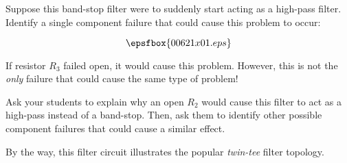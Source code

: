 

Suppose this band-stop filter were to suddenly start acting as a high-pass filter.  Identify a single component failure that could cause this problem to occur:

$$\epsfbox{00621x01.eps}$$







If resistor $R_3$ failed open, it would cause this problem.  However, this is not the {\it only} failure that could cause the same type of problem!







Ask your students to explain why an open $R_2$ would cause this filter to act as a high-pass instead of a band-stop.  Then, ask them to identify other possible component failures that could cause a similar effect.

By the way, this filter circuit illustrates the popular {\it twin-tee} filter topology.




